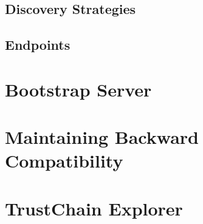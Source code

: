 \subsection{Discovery Strategies}

\subsection{Endpoints}

\section{Bootstrap Server}





\section{Maintaining Backward Compatibility}

\section{TrustChain Explorer}

